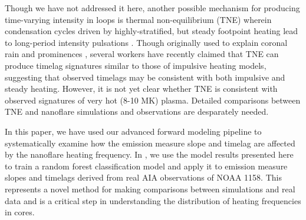 Though we have not addressed it here, another possible mechanism for producing time-varying intensity in \AR{} loops is thermal non-equilibrium (TNE) wherein condensation cycles driven by highly-stratified, but steady footpoint heating lead to long-period intensity pulsations \citep{kuin_thermal_1982}. Though originally used to explain coronal rain \citep{antolin_coronal_2010,antolin_multithermal_2015,auchere_coronal_2018} and prominences \citep{antiochos_model_1991}, several workers \citep{lionello_can_2016,winebarger_investigation_2016,froment_long-period_2017,winebarger_identifying_2018,froment_occurrence_2018} have recently claimed that TNE can produce timelag signatures similar to those of impulsive heating models, suggesting that observed timelags may be consistent with both impulsive and steady heating. However, it is not yet clear whether TNE is consistent with observed signatures of very hot (8-10 MK) plasma. Detailed comparisons between TNE and nanoflare simulations and observations are desparately needed.

In this paper, we have used our advanced forward modeling pipeline to systematically examine how the emission measure slope and timelag are affected by the nanoflare heating frequency. In , we use the model results presented here to train a random forest classification model and apply it to emission measure slopes and timelags derived from real AIA observations of NOAA 1158. This represents a novel method for making comparisons between simulations and real data and is a critical step in understanding the distribution of heating frequencies in \AR{} cores.
